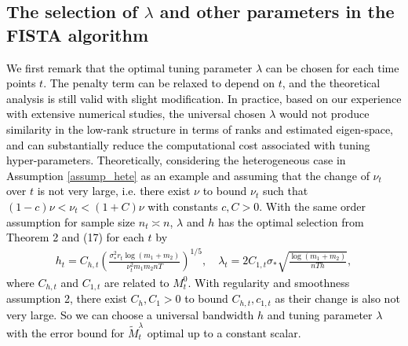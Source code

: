 \documentclass[12pt]{article}
\newcommand{\change}[1]{\textcolor{black}{#1}}
\begin{document}
\subsection{The selection of $\lambda$ and other parameters in the FISTA algorithm}  
\label{secS:lambda}

\change{
We first remark that the optimal tuning parameter $\lambda$ can be chosen for each time points $t$. The penalty term can be relaxed to depend on $t$, and the theoretical analysis is still valid with slight modification. In practice, based on our experience with  extensive numerical studies, the universal chosen $\lambda$ would not produce similarity in the low-rank structure in terms of ranks and estimated eigen-space, and can substantially reduce the computational cost associated with tuning hyper-parameters. Theoretically, considering the heterogeneous case in Assumption \ref{assump_hete} as an example and assuming that the change of $\nu_t$ over $t$ is not very large, i.e. there exist $\nu$ to bound $\nu_t$ such that $(1-c)\nu <\nu_t< (1+C)\nu$ with constants $c,C>0$. With the same order assumption for sample size $n_t\asymp n$, $\lambda$ and $h$ has the optimal selection from Theorem 2 and (17) for each $t$ by
\begin{align}
\label{eq:tuning}
h_t=C_{h,t}\left(\frac{\sigma_*^2 r_t \log \left(m_1+m_2\right)}{\nu_t^2 m_1 m_2 n T}\right)^{1 / 5},\quad 
\lambda_t=2 C_{1,t} \sigma_* \sqrt{\frac{\log \left(m_1+m_2\right)}{n T h}},
\end{align}
where $C_{h,t}$ and $C_{1,t}$ are related to $M_t^0$. With regularity and smoothness assumption 2, there exist $C_h,C_1>0$ to bound $C_{h,t},c_{1,t}$ as their change is also not very large. So we can choose a universal bandwidth $h$ and tuning parameter $\lambda$ with the error bound for $\widetilde{M}^\lambda_t$ optimal up to a constant scalar.}
\end{document}
